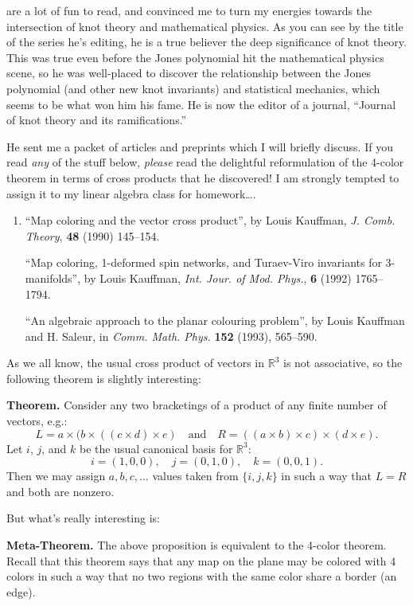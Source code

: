 \documentclass{article}
\begin{document}
are a lot of fun to read, and convinced me to turn my energies towards
the intersection of knot theory and mathematical physics. As you can see
by the title of the series he's editing, he is a true believer the deep
significance of knot theory. This was true even before the Jones
polynomial hit the mathematical physics scene, so he was well-placed to
discover the relationship between the Jones polynomial (and other new
knot invariants) and statistical mechanics, which seems to be what won
him his fame. He is now the editor of a journal, ``Journal of knot
theory and its ramifications.''

He sent me a packet of articles and preprints which I will briefly
discuss. If you read \emph{any} of the stuff below, \emph{please} read
the delightful reformulation of the 4-color theorem in terms of cross
products that he discovered! I am strongly tempted to assign it to my
linear algebra class for homework\ldots.

\begin{enumerate}
\def\labelenumi{\arabic{enumi})}
\item
  ``Map coloring and the vector cross product'', by Louis Kauffman,
  \emph{J. Comb. Theory}, \textbf{48} (1990) 145--154.

  ``Map coloring, 1-deformed spin networks, and Turaev-Viro invariants
  for 3-manifolds'', by Louis Kauffman, \emph{Int. Jour. of Mod. Phys.},
  \textbf{6} (1992) 1765--1794.

  ``An algebraic approach to the planar colouring problem'', by Louis
  Kauffman and H. Saleur, in \emph{Comm. Math. Phys.} \textbf{152}
  (1993), 565--590.
\end{enumerate}

As we all know, the usual cross product of vectors in \(\mathbb{R}^3\)
is not associative, so the following theorem is slightly interesting:

\textbf{Theorem.} Consider any two bracketings of a product of any
finite number of vectors, e.g.:
\[L = a \times (b \times ((c \times d) \times e) \quad\text{and}\quad  R = ((a \times b) \times c) \times (d \times e).\]
Let \(i\), \(j\), and \(k\) be the usual canonical basis for
\(\mathbb{R}^3\): \[i = (1,0,0), \quad j = (0,1,0), \quad k = (0,0,1).\]
Then we may assign \(a,b,c,\ldots\) values taken from \(\{i,j,k\}\) in
such a way that \(L = R\) and both are nonzero.

But what's really interesting is:

\textbf{Meta-Theorem.} The above proposition is equivalent to the
4-color theorem. Recall that this theorem says that any map on the plane
may be colored with 4 colors in such a way that no two regions with the
same color share a border (an edge).
\end{document}
